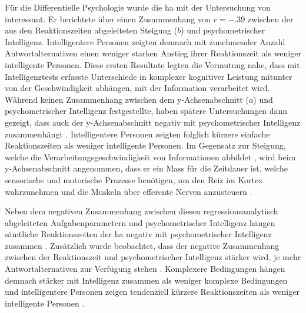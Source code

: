 \documentclass[11pt, twoside, a4paper]{book}		%
\begin{document}
Für die Differentielle Psychologie wurde die \gls{ha} mit der Untersuchung von \citet{Roth1964} interessant. Er berichtete über einen Zusammenhang von $r=-.39$ zwischen der aus den Reaktionszeiten abgeleiteten Steigung ($b$) und psychometrischer Intelligenz. Intelligentere Personen zeigten demnach mit zunehmender Anzahl Ant\-wort\-alt\-er\-na\-ti\-ven einen weniger starken Anstieg ihrer Reaktionszeit als weniger intelligente Personen. Diese ersten Resultate legten die Vermutung nahe, dass mit Intelligenztests erfasste Unterschiede in komplexer kognitiver Leistung mitunter von der Geschwindigkeit abhängen, mit der Information verarbeitet wird.
Während \citeauthor{Roth1964} keinen Zusammenhang zwischen dem y-Ach\-sen\-ab\-schnitt ($a$) und psychometrischer Intelligenz festgestellte, haben spätere Untersuchungen dann gezeigt, dass auch der y-Ach\-sen\-ab\-schnitt negativ mit psychometrischer Intelligenz zusammenhängt \citep[z.~B.][]{Jensen1982b, Jensen1987a, Neubauer1997a, Neubauer1997b}. Intelligentere Personen zeigten folglich kürzere einfache Reaktionszeiten als weniger intelligente Personen. Im Gegensatz zur Steigung, welche die Verarbeitungsgeschwindigkeit von Informationen abbildet \citep{Jensen1998b, Roth1964}, wird beim y-Ach\-sen\-ab\-schnitt angenommen, dass er ein Mass für die Zeitdauer ist, welche sensorische und motorische Prozesse benötigen, um den Reiz im Kortex wahrzunehmen und die Muskeln über efferente Nerven anzusteuern \citep{Jensen1998b}.

Neben dem negativen Zusammenhang zwischen diesen regressionsanalytisch abgeleiteten Aufgabenparametern und psychometrischer Intelligenz hängen sämtliche  Reaktionszeiten der \gls{ha} negativ mit psychometrischer Intelligenz zusammen \citep[$r=-.22$ bis $-.40$;][]{Sheppard2008}. Zusätzlich wurde beobachtet, dass der negative Zusammenhang zwischen der Reaktionszeit und psychometrischer Intelligenz stärker wird, je mehr Antwortalternativen zur Verfügung stehen \citep{Vernon1984}. Komplexere Bedingungen hängen demnach stärker mit Intelligenz zusammen als weniger komplexe Bedingungen und intelligentere Personen zeigen tendenziell kürzere Reaktionszeiten als weniger intelligente Personen \citep{Sheppard2008}.
\end{document}
